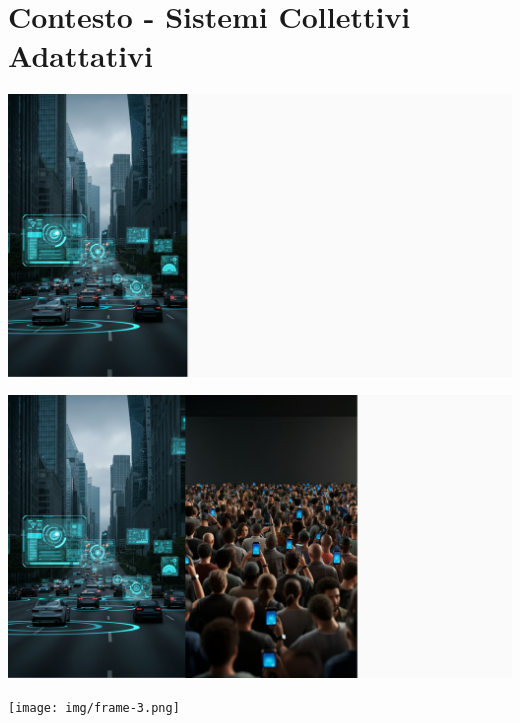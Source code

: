 \documentclass[presentation, 10pt,aspectratio=169]{beamer}\mode<presentation>{\usetheme{AMSBolognaFC}}
\begin{document}
\section{Contesto - Sistemi Collettivi Adattativi}
{
\usebackgroundtemplate%
{\includegraphics[width=\paperwidth,height=\paperheight]{img/frame-1.png}}
\begin{frame}\end{frame}
}
{
\usebackgroundtemplate%
{\includegraphics[width=\paperwidth,height=\paperheight]{img/frame-2.png}}
\begin{frame}\end{frame}
}
{
\usebackgroundtemplate%
{\texttt{[image: img/frame-3.png]}}
\begin{frame}\end{frame}
}
\end{document}
